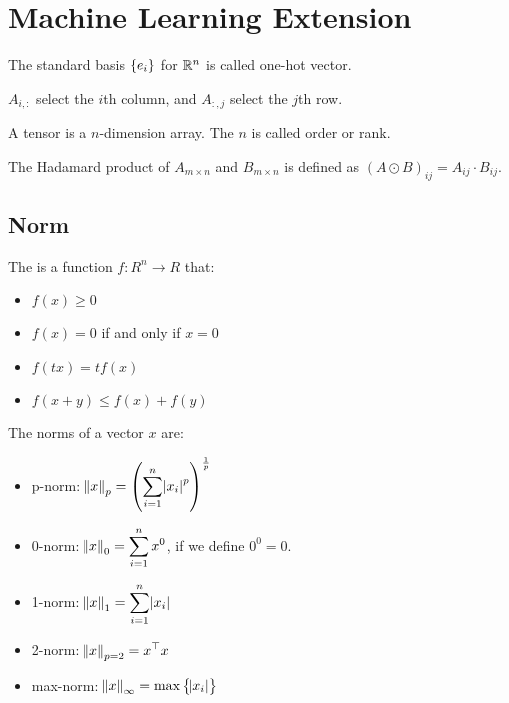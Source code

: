 \chapter{Machine Learning Extension}


The standard basis $\set{e_i}$ for $\mathbb{R}^n$ is called one-hot vector.

$A_{i,:}$ select the $i$th column, and $A_{:,j}$ select the $j$th row.

A tensor is a $n$-dimension array. The $n$ is called order or rank.


\begin{definition}
    The Hadamard product of $A_{m \times n}$ and $B_{m\times n}$ is defined as $(A \odot B)_{ij} = A_{ij} \cdot B_{ij}$.
\end{definition}

\section{Norm}

\begin{definition}[Norm]
    The  is a function $f : R^n \rightarrow R$ that:
    \begin{itemize}
        \item $f(x) \geq 0$
        \item $f(x) = 0$ if and only if $x = 0$
        \item $f(tx) = t f(x)$
        \item $f(x+y) \leq f(x) + f(y)$
    \end{itemize}
\end{definition}

\begin{definition}
    The norms of a vector $x$ are:
\begin{itemize}
    \item p-norm: $\displaystyle \norm{x}_p = \mleft(\sum_{i=1}^n \absolutevalue{x_i}^p \mright)^{\frac{1}{p}}$
    \item 0-norm: $\displaystyle \norm{x}_0 = \sum_{i=1}^n x^0$, if we define $0^0 = 0$.
    \item 1-norm: $\displaystyle \norm{x}_1 = \sum_{i=1}^n \abs{x_i}$
    \item 2-norm: $\displaystyle \norm{x}_{p=2} = {x}^\top x$
    \item max-norm: $\norm{x}_\infty = \max \set{\abs{x_i}}$
\end{itemize}
\end{definition}

